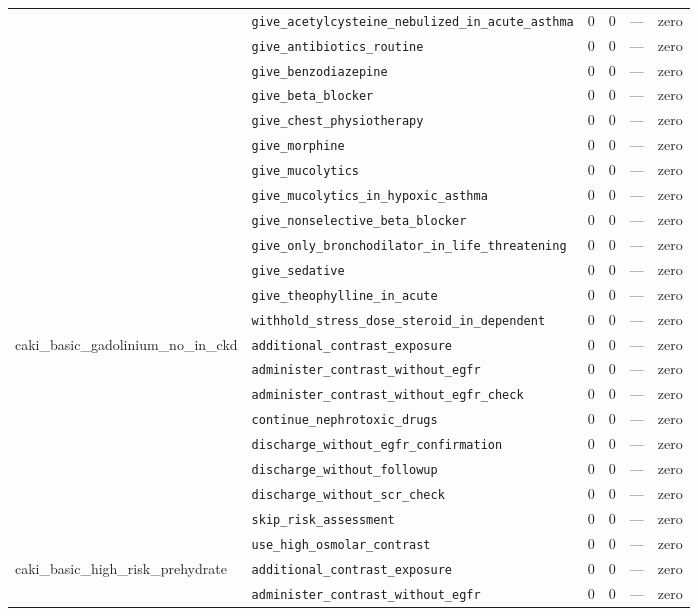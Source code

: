 \begin{table}[ht]
\begin{tabular}{llrrrl}
 & \texttt{give\_acetylcysteine\_nebulized\_in\_acute\_asthma} & 0 & 0 & — & zero \\
 & \texttt{give\_antibiotics\_routine} & 0 & 0 & — & zero \\
 & \texttt{give\_benzodiazepine} & 0 & 0 & — & zero \\
 & \texttt{give\_beta\_blocker} & 0 & 0 & — & zero \\
 & \texttt{give\_chest\_physiotherapy} & 0 & 0 & — & zero \\
 & \texttt{give\_morphine} & 0 & 0 & — & zero \\
 & \texttt{give\_mucolytics} & 0 & 0 & — & zero \\
 & \texttt{give\_mucolytics\_in\_hypoxic\_asthma} & 0 & 0 & — & zero \\
 & \texttt{give\_nonselective\_beta\_blocker} & 0 & 0 & — & zero \\
 & \texttt{give\_only\_bronchodilator\_in\_life\_threatening} & 0 & 0 & — & zero \\
 & \texttt{give\_sedative} & 0 & 0 & — & zero \\
 & \texttt{give\_theophylline\_in\_acute} & 0 & 0 & — & zero \\
 & \texttt{withhold\_stress\_dose\_steroid\_in\_dependent} & 0 & 0 & — & zero \\
\midrule
caki\_basic\_gadolinium\_no\_in\_ckd & \texttt{additional\_contrast\_exposure} & 0 & 0 & — & zero \\
 & \texttt{administer\_contrast\_without\_egfr} & 0 & 0 & — & zero \\
 & \texttt{administer\_contrast\_without\_egfr\_check} & 0 & 0 & — & zero \\
 & \texttt{continue\_nephrotoxic\_drugs} & 0 & 0 & — & zero \\
 & \texttt{discharge\_without\_egfr\_confirmation} & 0 & 0 & — & zero \\
 & \texttt{discharge\_without\_followup} & 0 & 0 & — & zero \\
 & \texttt{discharge\_without\_scr\_check} & 0 & 0 & — & zero \\
 & \texttt{skip\_risk\_assessment} & 0 & 0 & — & zero \\
 & \texttt{use\_high\_osmolar\_contrast} & 0 & 0 & — & zero \\
\midrule
caki\_basic\_high\_risk\_prehydrate & \texttt{additional\_contrast\_exposure} & 0 & 0 & — & zero \\
 & \texttt{administer\_contrast\_without\_egfr} & 0 & 0 & — & zero \\

\end{tabular}
\end{table}

